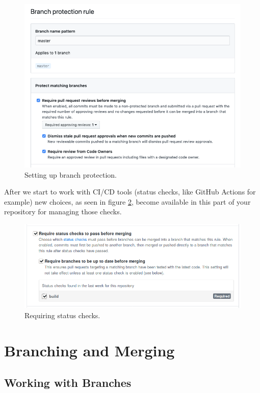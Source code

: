 \begin{figure}[!htb]
\centering
\includegraphics[scale=0.50]{images/github-branch-protection.png}
\caption{Setting up branch protection.}
\label{branchprotect}
\end{figure}

\justify{}
After we start to work with CI/CD tools (status checks, like GitHub Actions for example) new choices, as seen in figure \ref{statuscheck}, become
available in this part of your repository for managing those checks.

\begin{figure}
\centering
\includegraphics[scale=0.53]{images/guthub-status-check.png}
\caption{Requiring status checks.}
\label{statuscheck}
\end{figure}

\section{Branching and Merging}
\subsection{Working with Branches}

